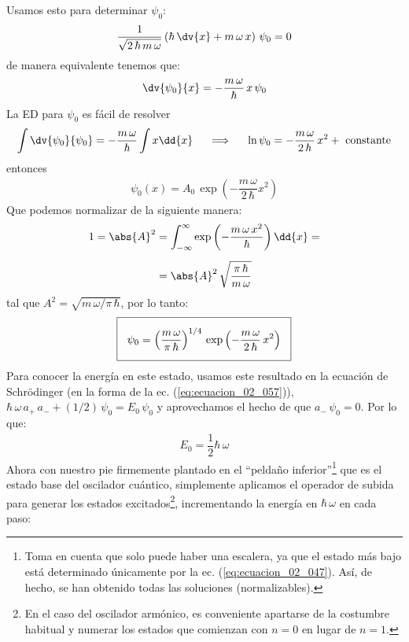 Usamos esto para determinar $\psi_{0}$:
\begin{align*}
\dfrac{1}{\sqrt{2 \, \hbar \, m \, \omega}} \left( \hbar \, \dv{x} + m \, \omega \, x \right) \, \psi_{0} = 0
\end{align*}
de manera equivalente tenemos que:
\begin{align*}
\dv{\psi_{0}}{x} = - \dfrac{m \, \omega}{\hbar} \, x \, \psi_{0}
\end{align*}
La ED para $\psi_{0}$ es fácil de resolver
\begin{align*}
\int \dv{\psi_{0}}{\psi_{0}} = - \dfrac{m \, \omega}{\hbar} \int x \dd{x} \hspace{0.5cm} \Longrightarrow \hspace{0.5cm} \ln \psi_{0} = - \dfrac{m \, \omega}{2 \, \hbar} \, x^{2} + \text{ constante}
\end{align*}
entonces
\begin{align}
\psi_{0} (x) = A_{0} \, \exp \left( - \dfrac{m \, \omega}{2 \, \hbar} x^{2} \right)
\end{align}
Que podemos normalizar de la siguiente manera:
\begin{align*}
1 = \abs{A}^{2} &= \int_{-\infty}^{\infty} \exp \left( - \dfrac{m \, \omega \, x^{2}}{\hbar} \right) \dd{x} = \\[0.5em]
&= \abs{A}^{2} \, \sqrt{\dfrac{\pi \, \hbar}{m \, \omega}}
\end{align*}
tal que $A^{2} = \sqrt{m \, \omega / \pi \, \hbar}$, por lo tanto:
\begin{align}
\setlength{\fboxsep}{3\fboxsep}\boxed{
\psi_{0} = \left( \dfrac{m \, \omega}{\pi \, \hbar} \right)^{1/4} \, \exp \left( - \dfrac{m \, \omega}{2 \, \hbar} \, x^{2} \right)
}
\label{eq:ecuacion_02_059}
\end{align}
Para conocer la energía en este estado, usamos este resultado en la ecuación de Schrödinger (en la forma de la ec. (\ref{eq:ecuacion_02_057})), $\hbar \, \omega \, a_{+} \, a_{-} + (1/2) \, \psi_{0}  = E_{0} \, \psi_{0}$ y aprovechamos el hecho de que $a_{-} \, \psi_{0} = 0$. Por lo que:
\begin{align}
E_{0} = \dfrac{1}{2} \hbar \, \omega
\label{eq:ecuacion_02_060}
\end{align}
Ahora con nuestro pie firmemente plantado en el \enquote{peldaño inferior}\footnote{Toma en cuenta que solo puede haber una escalera, ya que el estado más bajo está determinado únicamente por la ec. (\ref{eq:ecuacion_02_047}). Así, de hecho, se han obtenido todas las soluciones (normalizables).} que es el estado base del oscilador cuántico, simplemente aplicamos el operador de subida para generar los estados excitados\footnote{ En el caso del oscilador armónico, es conveniente apartarse de la costumbre habitual y numerar los estados que comienzan con $n = 0$ en lugar de $n = 1$.}, incrementando la energía en $\hbar \, \omega$ en cada paso:
